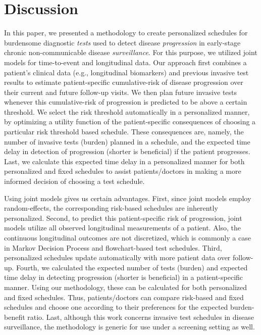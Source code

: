 \section{Discussion}
\label{sec:discussion}
In this paper, we presented a methodology to create personalized schedules for burdensome diagnostic \textit{tests} used to detect disease \textit{progression} in early-stage chronic non-communicable disease \textit{surveillance}. For this purpose, we utilized joint models for time-to-event and longitudinal data. Our approach first combines a patient's clinical data (e.g., longitudinal biomarkers) and previous invasive test results to estimate patient-specific cumulative-risk of disease progression over their current and future follow-up visits. We then plan future invasive tests whenever this cumulative-risk of progression is predicted to be above a certain threshold. We select the risk threshold automatically in a personalized manner, by optimizing a utility function of the patient-specific consequences of choosing a particular risk threshold based schedule. These consequences are, namely, the number of invasive tests (burden) planned in a schedule, and the expected time delay in detection of progression (shorter is beneficial) if the patient progresses. Last, we calculate this expected time delay in a personalized manner for both personalized and fixed schedules to assist patients/doctors in making a more informed decision of choosing a test schedule.

Using joint models gives us certain advantages. First, since joint models employ random-effects, the corresponding risk-based schedules are inherently personalized. Second, to predict this patient-specific risk of progression, joint models utilize all observed longitudinal measurements of a patient. Also, the continuous longitudinal outcomes are not discretized, which is commonly a case in Markov Decision Process and flowchart-based test schedules. Third, personalized schedules update automatically with more patient data over follow-up. Fourth, we calculated the expected number of tests (burden) and expected time delay in detecting progression (shorter is beneficial) in a patient-specific manner. Using our methodology, these can be calculated for both personalized and fixed schedules. Thus, patients/doctors can compare risk-based and fixed schedules and choose one according to their preferences for the expected burden-benefit ratio. Last, although this work concerns invasive test schedules in disease surveillance, the methodology is generic for use under a screening setting as well.

